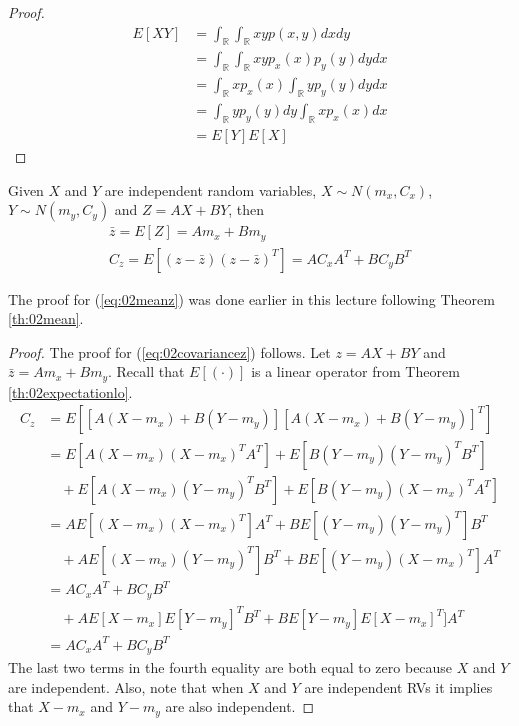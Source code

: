 \begin{proof}
\begin{align*}
E[XY] &= \int_\mathbb{R}\int_\mathbb{R} xyp(x,y)dxdy \\
&= \int_\mathbb{R}\int_\mathbb{R} xyp_x(x)p_y(y)dydx \\
&= \int_\mathbb{R} xp_x(x)\int_\mathbb{R} yp_y(y)dydx \\
&= \int_\mathbb{R} yp_y(y)dy \int_\mathbb{R} xp_x(x)dx \\
&= E[Y]E[X]
\end{align*}
\end{proof}

\begin{theorem}
\label{th:02covariance}
Given $X$ and $Y$ are independent random variables, $X\sim N(m_x,C_x)$, $Y\sim N(m_y,C_y)$ and $Z=AX+BY$, then
\begin{align}
\label{eq:02meanz}
\bar{z} = E[Z] = Am_x+Bm_y \\
\label{eq:02covariancez}
C_z = E[(z-\bar{z})(z-\bar{z})^T] = AC_xA^T + BC_yB^T
\end{align}
\end{theorem}

The proof for (\ref{eq:02meanz}) was done earlier in this lecture following Theorem \ref{th:02mean}.

\begin{proof}
The proof for (\ref{eq:02covariancez}) follows. Let $z=AX+BY$ and $\bar{z}=Am_x+Bm_y$. Recall that $E[(\cdot)]$ is a linear operator from Theorem \ref{th:02expectationlo}.
\begin{align*}
C_z &= E\left[[A(X-m_x)+B(Y-m_y)][A(X-m_x)+B(Y-m_y)]^T\right] \\
&= E[A(X-m_x)(X-m_x)^TA^T] + E[B(Y-m_y)(Y-m_y)^TB^T] \\
&\quad + E[A(X-m_x)(Y-m_y)^TB^T] + E[B(Y-m_y)(X-m_x)^TA^T] \\
&= AE[(X-m_x)(X-m_x)^T]A^T + BE[(Y-m_y)(Y-m_y)^T]B^T \\
&\quad + AE[(X-m_x)(Y-m_y)^T]B^T + BE[(Y-m_y)(X-m_x)^T]A^T \\
&= AC_xA^T + BC_yB^T \\
&\quad + AE[X-m_x]E[Y-m_y]^TB^T + BE[Y-m_y]E[X-m_x]^T]A^T \\
&= AC_xA^T + BC_yB^T
\end{align*}
The last two terms in the fourth equality are both equal to zero because $X$ and $Y$ are independent. Also, note that when $X$ and $Y$ are independent RVs it implies that $X-m_x$ and $Y-m_y$ are also independent.
\end{proof}

